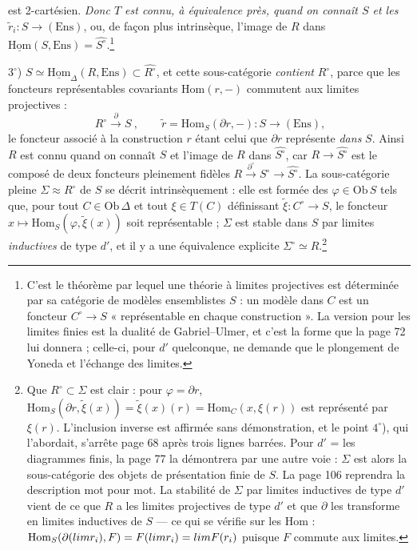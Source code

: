 \documentclass[11pt,a4paper]{article}
\begin{document}
est 2-cartésien. \emph{Donc $T$ est connu, à équivalence près, quand on
connaît $S$ et les $\tilde{r}_{i} : S \to (\mathrm{Ens})$}, ou, de façon plus
intrinsèque, l'image de $R$ dans $\underline{\mathrm{Hom}}(S, \mathrm{Ens}) =
\widehat{S^{\circ}}$.\footnote{C'est le théorème par lequel une théorie à
limites projectives est déterminée par sa catégorie de modèles
ensemblistes $S$ : un modèle dans $C$ est un foncteur $C^{\circ} \to S$
« représentable en chaque construction ». La version pour les limites
finies est la dualité de Gabriel--Ulmer, et c'est la forme que la page 72
lui donnera ; celle-ci, pour $d'$ quelconque, ne demande que le
plongement de Yoneda et l'échange des limites.}

$3^{\circ}$) $S \simeq \underline{\mathrm{Hom}}_{\Delta}(R, \mathrm{Ens})
\subset \widehat{R^{\circ}}$, et cette sous-catégorie \emph{contient}
$R^{\circ}$, parce que les foncteurs représentables covariants $\mathrm{Hom}
(r, -)$ commutent aux limites projectives :
\[
\boxed{\ R^{\circ} \xrightarrow{\ \partial\ } S\ }, \qquad
\tilde{r} = \mathrm{Hom}_{S}(\partial r, -) : S \to (\mathrm{Ens}),
\]
le foncteur associé à la construction $r$ étant celui que $\partial r$
représente \emph{dans} $S$. Ainsi $R$ est connu quand on connaît $S$ et
l'image de $R$ dans $\widehat{S^{\circ}}$, car $R \to \widehat{S^{\circ}}$
est le composé de deux foncteurs pleinement fidèles $R \xrightarrow{
\partial^{\circ}} S^{\circ} \to \widehat{S^{\circ}}$. La sous-catégorie
pleine $\Sigma \approx R^{\circ}$ de $S$ se décrit intrinsèquement : elle
est formée des $\varphi \in \mathrm{Ob}\,S$ tels que, pour tout $C \in
\mathrm{Ob}\,\Delta$ et tout $\xi \in T(C)$ définissant $\tilde\xi :
C^{\circ} \to S$, le foncteur $x \mapsto \mathrm{Hom}_{S}(\varphi,
\tilde\xi(x))$ soit représentable ; $\Sigma$ est stable dans $S$ par
limites \emph{inductives} de type $d'$, et il y a une équivalence
explicite $\Sigma^{\circ} \simeq R$.\footnote{Que $R^{\circ} \subset \Sigma$
est clair : pour $\varphi = \partial r$, $\mathrm{Hom}_{S}(\partial r,
\tilde\xi(x)) = \tilde\xi(x)(r) = \mathrm{Hom}_{C}(x, \xi(r))$ est
représenté par $\xi(r)$. L'inclusion inverse est affirmée sans
démonstration, et le point $4^{\circ}$), qui l'abordait, s'arrête page 68
après trois lignes barrées. Pour $d'$ = les diagrammes finis, la page 77
la démontrera par une autre voie : $\Sigma$ est alors la sous-catégorie des
objets de présentation finie de $S$. La page 106 reprendra la description
mot pour mot. La stabilité de $\Sigma$ par limites inductives de type $d'$
vient de ce que $R$ a les limites projectives de type $d'$ et que $\partial$
les transforme en limites inductives de $S$ — ce qui se vérifie sur les
Hom : $\mathrm{Hom}_{S}(\partial(\varprojlim r_{i}), F) = F(\varprojlim
r_{i}) = \varprojlim F(r_{i})$ puisque $F$ commute aux limites.}
\end{document}
